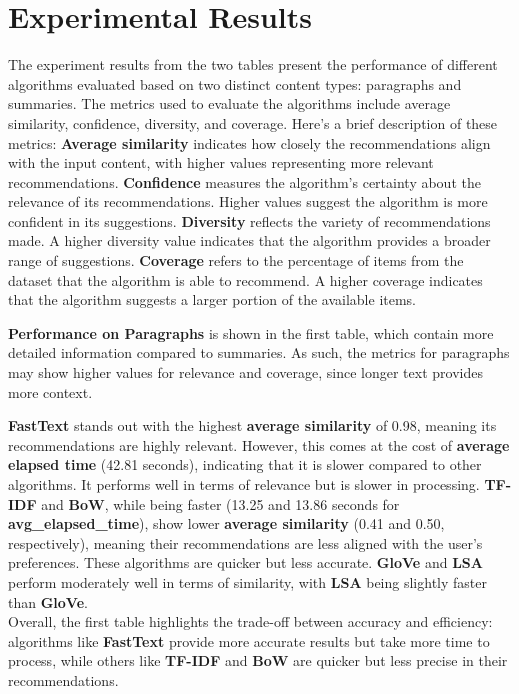 \documentclass{llncs}
\begin{document}
\section{Experimental Results}
%
The experiment results from the two tables present the performance of different algorithms evaluated based on two distinct content types: paragraphs and summaries. The metrics used to evaluate the algorithms include average similarity, confidence, diversity, and coverage. Here's a brief description of these metrics:
\textbf{Average similarity} indicates how closely the recommendations align with the input content, with higher values representing more relevant recommendations. \textbf{Confidence} measures the algorithm’s certainty about the relevance of its recommendations. Higher values suggest the algorithm is more confident in its suggestions. \textbf{Diversity} reflects the variety of recommendations made. A higher diversity value indicates that the algorithm provides a broader range of suggestions.
\textbf{Coverage} refers to the percentage of items from the dataset that the algorithm is able to recommend. A higher coverage indicates that the algorithm suggests a larger portion of the available items.

\noindent
\textbf{Performance on Paragraphs} is shown in the first table, which contain more detailed information compared to summaries. As such, the metrics for paragraphs may show higher values for relevance and coverage, since longer text provides more context.

\noindent
\textbf{FastText} stands out with the highest \textbf{average similarity} of 0.98, meaning its recommendations are highly relevant. However, this comes at the cost of \textbf{average elapsed time} (42.81 seconds), indicating that it is slower compared to other algorithms. It performs well in terms of relevance but is slower in processing. \textbf{TF-IDF} and \textbf{BoW}, while being faster (13.25 and 13.86 seconds for \textbf{avg\_elapsed\_time}), show lower \textbf{average similarity} (0.41 and 0.50, respectively), meaning their recommendations are less aligned with the user’s preferences. These algorithms are quicker but less accurate. \textbf{GloVe} and \textbf{LSA} perform moderately well in terms of similarity, with \textbf{LSA} being slightly faster than \textbf{GloVe}.\\
Overall, the first table highlights the trade-off between accuracy and efficiency: algorithms like \textbf{FastText} provide more accurate results but take more time to process, while others like \textbf{TF-IDF} and \textbf{BoW} are quicker but less precise in their recommendations.
\end{document}
